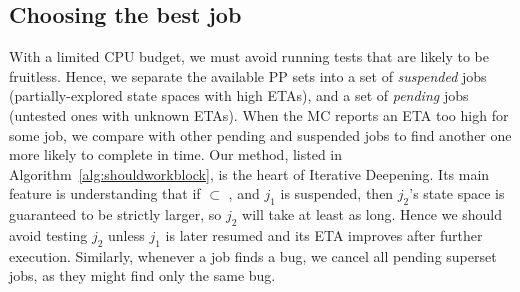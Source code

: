 

\subsection{Choosing the best job}

With a limited CPU budget, we must avoid running tests that are likely to be fruitless.
Hence, we separate the available PP sets into a set of {\em suspended} jobs (partially-explored state spaces with high ETAs),
and a set of {\em pending} jobs (untested ones with unknown ETAs).
When the MC reports an ETA too high for some job,
we compare with other pending and suspended jobs to find another one more likely to complete in time.
%
Our method,
listed in Algorithm~\ref{alg:shouldworkblock}, is the heart of Iterative Deepening.
Its main feature is understanding that if  $\subset$ ,
and $j_1$ is suspended,
then $j_2$'s state space is guaranteed to be strictly larger, so $j_2$ will take at least as long.
Hence we should avoid testing $j_2$ unless $j_1$ is later resumed and its ETA improves after further execution. %
Similarly, whenever a job finds a bug, we cancel all pending superset jobs, as they might find only the same bug.


